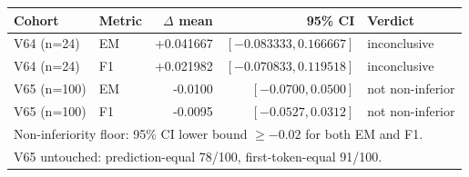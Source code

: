 \begin{tabular}{llrrl}
\toprule
Cohort & Metric & $\Delta$ mean & 95\% CI & Verdict \\
\midrule
V64 (n=24) & EM & +0.041667 & $[-0.083333, 0.166667]$ & inconclusive \\
V64 (n=24) & F1 & +0.021982 & $[-0.070833, 0.119518]$ & inconclusive \\
\midrule
V65 (n=100) & EM & -0.0100 & $[-0.0700, 0.0500]$ & not non-inferior \\
V65 (n=100) & F1 & -0.0095 & $[-0.0527, 0.0312]$ & not non-inferior \\
\midrule
\multicolumn{5}{l}{Non-inferiority floor: 95\% CI lower bound $\geq -0.02$ for both EM and F1.} \\
\multicolumn{5}{l}{V65 untouched: prediction-equal 78/100, first-token-equal 91/100.} \\
\bottomrule
\end{tabular}
